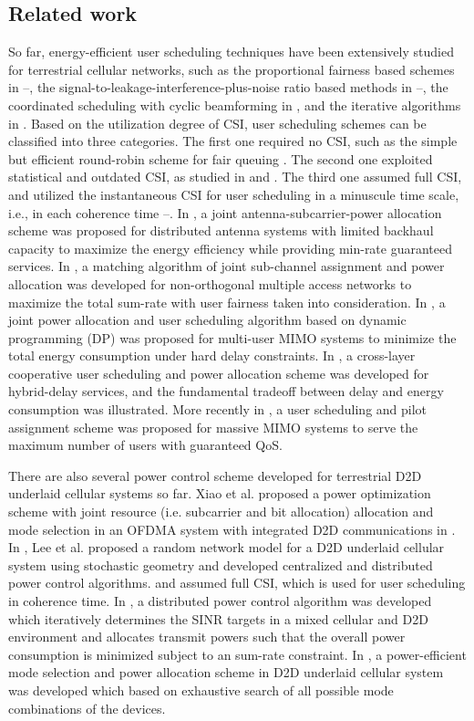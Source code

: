 \documentclass{ieeeaccess}
\begin{document}
\subsection{Related work}
So far, energy-efficient user scheduling techniques have been extensively studied for terrestrial cellular networks, such as the proportional fairness based schemes in \cite{p61}--\cite{p63}, the signal-to-leakage-interference-plus-noise ratio based methods in \cite{p64}--\cite{p66}, the coordinated scheduling with cyclic beamforming in \cite{p67}\cite{p68}, and the iterative algorithms in \cite{p69}\cite{p70}. Based on the utilization degree of CSI, user scheduling schemes can be classified into three categories. The first one required no CSI, such as the simple but efficient round-robin scheme for fair queuing \cite{p51}. The second one exploited statistical and outdated CSI, as studied in \cite{p52} and \cite{p53}. The third one assumed full CSI, and utilized the instantaneous CSI for user scheduling in a minuscule time scale, i.e., in each coherence time \cite{p3}--\cite{p7}. In \cite{p3}, a joint antenna-subcarrier-power allocation scheme was proposed for distributed antenna systems with limited backhaul capacity to maximize the energy efficiency while providing min-rate guaranteed services. In \cite{p6}, a matching algorithm of joint sub-channel assignment and power allocation was developed for non-orthogonal multiple access networks to maximize the total sum-rate with user fairness taken into consideration. In \cite{p4}, a joint power allocation and user scheduling algorithm based on dynamic programming (DP) was proposed for multi-user MIMO systems to minimize the total energy consumption under hard delay constraints. In \cite{p5}, a cross-layer cooperative user scheduling and power allocation scheme was developed for hybrid-delay services, and the fundamental tradeoff between delay and energy consumption was illustrated. More recently in \cite{p7}, a user scheduling and pilot assignment scheme was proposed for massive MIMO systems to serve the maximum number of users with guaranteed QoS.

There are also several power control scheme developed for terrestrial D2D underlaid cellular systems so far. Xiao et al. proposed a power optimization scheme with joint resource (i.e. subcarrier and bit allocation) allocation and mode selection in an OFDMA system with integrated D2D communications in \cite{p104}. In \cite{p105}, Lee et al. proposed a random network model for a D2D underlaid cellular system using stochastic geometry and developed centralized and distributed power control algorithms. \cite{104} and \cite{105} assumed full CSI, which is used for user scheduling in coherence time. In \cite{p106}, a distributed power control algorithm was developed which iteratively determines the SINR targets in a mixed cellular and D2D environment and allocates transmit powers such that the overall power consumption is minimized subject to an sum-rate constraint. In \cite{p107}, a power-efficient mode selection and power allocation scheme in D2D underlaid cellular system was developed which based on exhaustive search of all possible mode combinations of the devices.  
\end{document}
